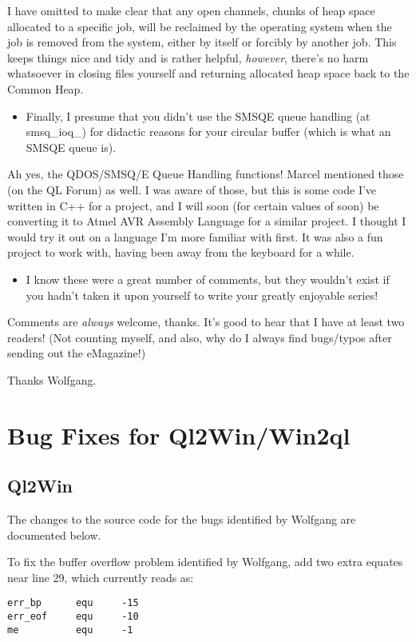 I have omitted to make clear that any open channels, chunks of heap
space allocated to a specific job, will be reclaimed by the operating
system when the job is removed from the system, either by itself or
forcibly by another job. This keeps things nice and tidy and is rather
helpful, \emph{however}, there's no harm whatsoever in closing files
yourself and returning allocated heap space back to the Common Heap.
\begin{itemize}
\item Finally, I presume that you didn't use the SMSQE queue handling (at
smsq\_ioq\_) for didactic reasons for your circular buffer (which
is what an SMSQE queue is).
\end{itemize}
Ah yes, the QDOS/SMSQ/E Queue Handling functions! Marcel mentioned
those (on the QL Forum) as well. I was aware of those, but this is
some code I've written in C++ for a project, and I will soon (for
certain values of soon) be converting it to Atmel AVR Assembly Language
for a similar project. I thought I would try it out on a language
I'm more familiar with first. It was also a fun project to work with,
having been away from the keyboard for a while.
\begin{itemize}
\item I know these were a great number of comments, but they wouldn't exist
if you hadn't taken it upon yourself to write your greatly enjoyable
series!
\end{itemize}
Comments are \emph{always} welcome, thanks. It's good to hear that
I have at least two readers! (Not counting myself, and also, why do
I always find bugs/typos after sending out the eMagazine!)

Thanks Wolfgang.

\section{Bug Fixes for Ql2Win/Win2ql}


\subsection{Ql2Win}

The changes to the source code for the bugs identified by Wolfgang
are documented below.

To fix the buffer overflow problem identified by Wolfgang, add two
extra equates near line 29, which currently reads as:

\begin{lstlisting}[showstringspaces=false,tabsize=4]
err_bp      equ     -15
err_eof     equ     -10
me          equ     -1
\end{lstlisting}

